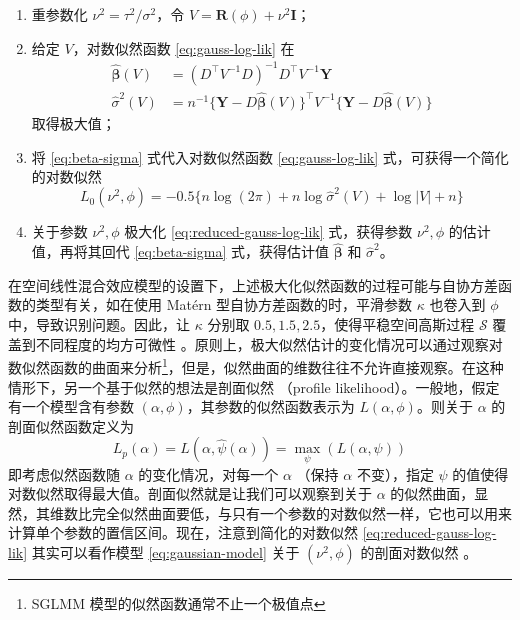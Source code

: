 \documentclass[12pt,a4paper,UTF8,twoside]{book}
\providecommand{\tightlist}{%
  \setlength{\itemsep}{0pt}\setlength{\parskip}{0pt}}
\theoremstyle{definition}
\theoremstyle{definition}
\theoremstyle{definition}
\theoremstyle{remark}
\begin{document}
\begin{enumerate}
\def\labelenumi{\arabic{enumi}.}
\tightlist
\item
  重参数化 \(\nu^2 = \tau^2/\sigma^2\)，令 \(V = \mathbf{R}(\phi) + \nu^2 \mathbf{I}\)；
\item
  给定 \(V\)，对数似然函数 \eqref{eq:gauss-log-lik} 在
  \begin{equation}
  \begin{aligned}
     \hat{\boldsymbol{\beta}}(V) & =  (D^{\top} V^{-1} D)^{-1} D^{\top} V^{-1}\mathbf{Y} \\
     \hat{\sigma}^2(V)           & =  n^{-1} \{\mathbf{Y} - D\hat{\boldsymbol{\beta}}(V)\}^{\top} V^{-1} \{\mathbf{Y} - D\hat{\boldsymbol{\beta}}(V)\}
  \end{aligned} \label{eq:beta-sigma}
  \end{equation}
  取得极大值；
\item
  将 \eqref{eq:beta-sigma} 式代入对数似然函数 \eqref{eq:gauss-log-lik} 式，可获得一个简化的对数似然
  \begin{equation}
     L_{0}(\nu^2,\phi) = - 0.5\{ n\log(2\pi) + n\log \hat{\sigma}^2(V) + \log |V| + n \} \label{eq:reduced-gauss-log-lik}
  \end{equation}
\item
  关于参数 \(\nu^2, \phi\) 极大化 \eqref{eq:reduced-gauss-log-lik} 式，获得参数 \(\nu^2, \phi\) 的估计值，再将其回代 \eqref{eq:beta-sigma} 式，获得估计值 \(\hat{\boldsymbol{\beta}}\) 和 \(\hat{\sigma}^2\)。
\end{enumerate}

在空间线性混合效应模型的设置下，上述极大化似然函数的过程可能与自协方差函数的类型有关，如在使用 Matérn 型自协方差函数的时，平滑参数 \(\kappa\) 也卷入到 \(\phi\) 中，导致识别问题。因此，让 \(\kappa\) 分别取 \(0.5,1.5,2.5\)，使得平稳空间高斯过程 \(\mathcal{S}\) 覆盖到不同程度的均方可微性 \citep{Warnes1987}。原则上，极大似然估计的变化情况可以通过观察对数似然函数的曲面来分析\footnote{SGLMM 模型的似然函数通常不止一个极值点}，但是，似然曲面的维数往往不允许直接观察。在这种情形下，另一个基于似然的想法是剖面似然 （profile likelihood）。一般地，假定有一个模型含有参数 \((\alpha,\phi)\)，其参数的似然函数表示为 \(L(\alpha,\phi)\)。则关于 \(\alpha\) 的剖面似然函数定义为
\begin{equation}
L_{p}(\alpha) = L(\alpha,\hat{\psi}(\alpha)) = \max_{\psi} (L(\alpha,\psi))
\label{eq:profile-log-lik}
\end{equation}
\noindent 即考虑似然函数随 \(\alpha\) 的变化情况，对每一个 \(\alpha\) （保持 \(\alpha\) 不变），指定 \(\psi\) 的值使得对数似然取得最大值。剖面似然就是让我们可以观察到关于 \(\alpha\) 的似然曲面，显然，其维数比完全似然曲面要低，与只有一个参数的对数似然一样，它也可以用来计算单个参数的置信区间。现在，注意到简化的对数似然 \eqref{eq:reduced-gauss-log-lik} 其实可以看作模型 \eqref{eq:gaussian-model} 关于 \((\nu^2,\phi)\) 的剖面对数似然 \citep{Diggle2007}。
\end{document}
